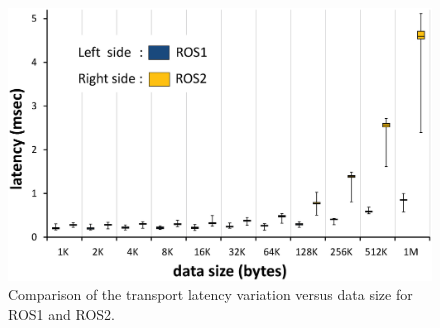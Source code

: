 \documentclass{sig-alternate-ipsn13}
\begin{document}

\begin{figure}[t]
\begin{center}
\includegraphics[scale=0.33]{img/graph.eps}
\end{center}
\vspace{-8.mm}
\caption{Comparison of the transport latency variation versus data size for ROS1 and ROS2.}
\vspace{-5.0mm}
\label{fig:graph}
\end{figure}



%
\vspace{-3.0mm}



%
%


\end{document}
